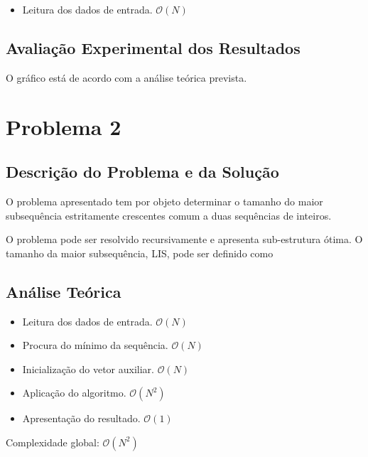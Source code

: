 \documentclass[12pt, letterpaper]{article}
\begin{document}
\begin{itemize}
	\item Leitura dos dados de entrada. $\mathcal{O}(N)$
\end{itemize}

\subsection{Avaliação Experimental dos Resultados}

\begin{figure}[H]
	\centering

\end{figure}

O gráfico está de acordo com a análise teórica prevista.


\section{Problema 2}
\subsection{Descrição do Problema e da Solução}

O problema apresentado tem por objeto determinar o tamanho do maior subsequência
estritamente crescentes comum a duas sequências de inteiros.

O problema pode ser resolvido recursivamente e apresenta sub-estrutura ótima.
O tamanho da maior subsequência, LIS, pode ser definido como

\begin{center}
\end{center}


\subsection{Análise Teórica}

\begin{itemize}
	\item Leitura dos dados de entrada. $\mathcal{O}(N)$
	\item Procura do mínimo da sequência. $\mathcal{O}(N)$
	\item Inicialização do vetor auxiliar. $\mathcal{O}(N)$
	\item Aplicação do algoritmo. $\mathcal{O}(N^2)$
	\item Apresentação do resultado. $\mathcal{O}(1)$
\end{itemize}
Complexidade global: $\mathcal{O}(N^2)$
\end{document}
